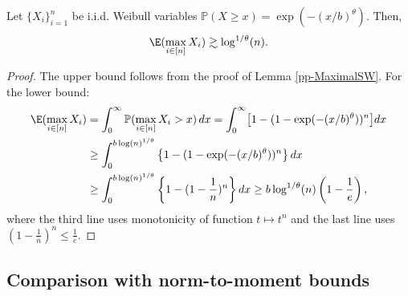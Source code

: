 \documentclass[11pt]{article}
\begin{document}
\begin{proposition}\label{prop:lowerbound}
Let $\{X_i\}_{i=1}^n$ be i.i.d. Weibull variables $\mathbb{P}(X\ge x)=\exp(-(x/b)^\theta)$. Then, 
\[
\E ( \max_{i\in [n]} X_i ) \gtrsim \log^{1 / \theta}(n).
\]
\end{proposition}
\begin{proof}
The upper bound follows from the proof of Lemma \ref{pp-MaximalSW}. For the lower bound:
\[
\begin{aligned}
\E ( \max_{i\in [n]} X_i ) & =\int_0^{\infty} \mathbb{P}(\max_{i\in [n]} X_i>x) \, d x= \int_0^\infty \bigl[1-(1-\exp(-(x/b)^\theta))^n\bigr] d x\\
&\geq \int_0^{b\log(n)^{1 / \theta}} \left\{1-(1-\exp(-(x/b)^\theta))^n\right\} d x\\
&\geq \int_0^{b\log(n)^{1 / \theta}} \left\{1-(1-\frac{1}{n})^n\right\}d x\geq b\log^{1 / \theta}(n) \left(1-\frac{1}{e}\right),
\end{aligned}
\]
where the third line uses monotonicity of function $t\mapsto t^n$ and the last line uses $(1-\frac{1}{n})^n\leq \frac{1}{e}$.
\end{proof}



\subsection{Comparison with norm-to-moment bounds}\label{app:max_comparison}
\end{document}
